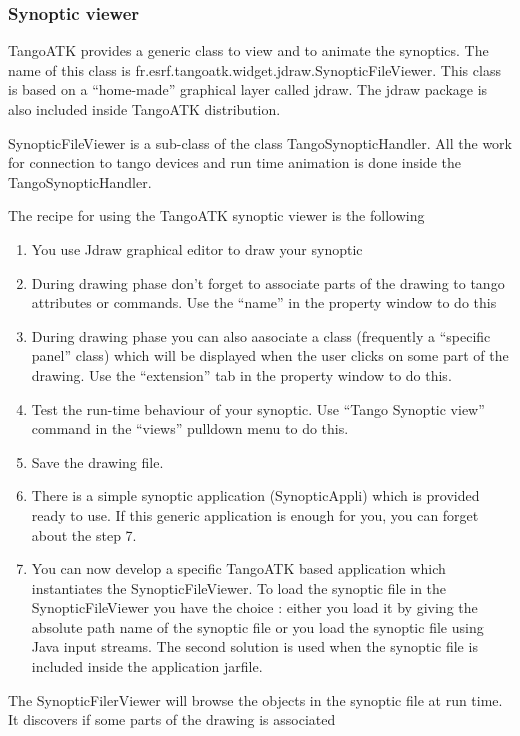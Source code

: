 \subsubsection{Synoptic viewer}

TangoATK provides a generic class to view and to animate the synoptics.
The name of this class is fr.esrf.tangoatk.widget.jdraw.SynopticFileViewer.
This class is based on a ``home-made'' graphical layer called jdraw.
The jdraw package is also included inside TangoATK distribution.

SynopticFileViewer is a sub-class of the class TangoSynopticHandler.
All the work for connection to tango devices and run time animation
is done inside the TangoSynopticHandler.

The recipe for using the TangoATK synoptic viewer is the following
\begin{enumerate}
\item You use Jdraw graphical editor to draw your synoptic 
\item During drawing phase don't forget to associate parts of the drawing
to tango attributes or commands. Use the ``name'' in the property
window to do this
\item During drawing phase you can also aasociate a class (frequently a
``specific panel'' class) which will be displayed when the user
clicks on some part of the drawing. Use the ``extension'' tab in
the property window to do this.
\item Test the run-time behaviour of your synoptic. Use ``Tango Synoptic
view'' command in the ``views'' pulldown menu to do this.
\item Save the drawing file.
\item There is a simple synoptic application (SynopticAppli) which is provided
ready to use. If this generic application is enough for you, you can
forget about the step 7.
\item You can now develop a specific TangoATK based application which instantiates
the SynopticFileViewer. To load the synoptic file in the SynopticFileViewer
you have the choice : either you load it by giving the absolute path
name of the synoptic file or you load the synoptic file using Java
input streams. The second solution is used when the synoptic file
is included inside the application jarfile.
\end{enumerate}
The SynopticFilerViewer will browse the objects in the synoptic file
at run time. It discovers if some parts of the drawing is associated
